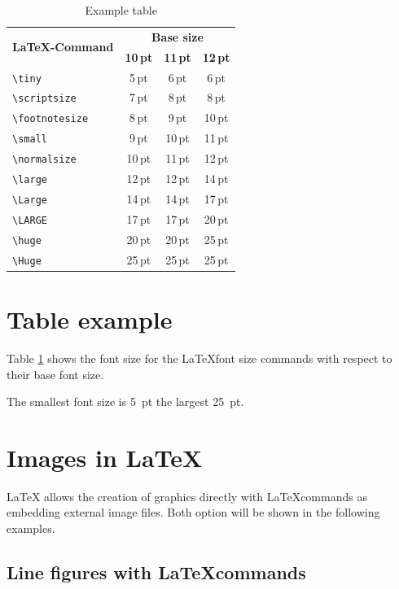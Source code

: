 \documentclass[11pt, a4paper]{article}
\newcommand{\ltx}{\LaTeX}
\begin{document}
\begin{table}[t]
\caption{Example table  \label{tab:Schriftgroessen}}
\centering
\begin{tabular}{lccc}
\toprule
\multirow{2}{*}{\textbf{\ltx-Command}} & \multicolumn{3}{c}{\textbf{Base size}}\\
\cline{2-4} & \textbf{10\,pt} & \textbf{11\,pt} & \textbf{12\,pt}\\
\midrule
\midrule
\verb+\tiny+			& 5\,pt & 6\,pt 	& 6\,pt\\
\verb+\scriptsize+		& 7\,pt & 8\,pt		& 8\,pt\\
\verb+\footnotesize+	& 8\,pt & 9\,pt		& 10\,pt\\
\verb+\small+			& 9\,pt & 10\,pt	& 11\,pt\\
\midrule
\midrule
\verb+\normalsize+		& 10\,pt	& 11\,pt	& 12\,pt\\
\midrule
\midrule
\verb+\large+			& 12\,pt	& 12\,pt	& 14\,pt\\
\verb+\Large+			& 14\,pt	& 14\,pt	& 17\,pt\\
\verb+\LARGE+			& 17\,pt	& 17\,pt	& 20\,pt\\
\verb+\huge+			& 20\,pt	& 20\,pt	& 25\,pt\\
\verb+\Huge+			& 25\,pt	& 25\,pt	& 25\,pt\\
\bottomrule
\end{tabular}
\end{table}%

\section{Table example}
Table \ref{tab:Schriftgroessen} shows the font size for the \ltx font size commands with respect to their base font size.

The smallest font size is 5~pt the largest 25~pt.

\section{Images in \ltx}
\ltx{} allows the creation of graphics directly with \ltx commands as embedding external image files. Both option will be shown in the following examples.

\subsection{Line figures with \ltx commands}
\end{document}
